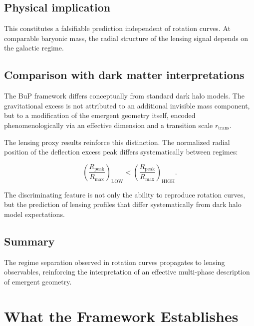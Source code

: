 \documentclass[11pt]{article}
\begin{document}
\subsection{Physical implication}

This constitutes a falsifiable prediction independent of rotation
curves. At comparable baryonic mass, the radial structure of the
lensing signal depends on the galactic regime.

\subsection{Comparison with dark matter interpretations}

The BuP framework differs conceptually from standard dark halo models.
The gravitational excess is not attributed to an additional invisible
mass component, but to a modification of the emergent geometry itself,
encoded phenomenologically via an effective dimension and a transition
scale $r_{\mathrm{trans}}$.

The lensing proxy results reinforce this distinction. The normalized
radial position of the deflection excess peak differs systematically
between regimes:

\[
\left(\frac{R_{\mathrm{peak}}}{R_{\max}}\right)_{\mathrm{LOW}}
<
\left(\frac{R_{\mathrm{peak}}}{R_{\max}}\right)_{\mathrm{HIGH}}.
\]

The discriminating feature is not only the ability to reproduce
rotation curves, but the prediction of lensing profiles that differ
systematically from dark halo model expectations.

\subsection{Summary}

The regime separation observed in rotation curves propagates to
lensing observables, reinforcing the interpretation of an effective
multi-phase description of emergent geometry.


\section{What the Framework Establishes}
\end{document}
